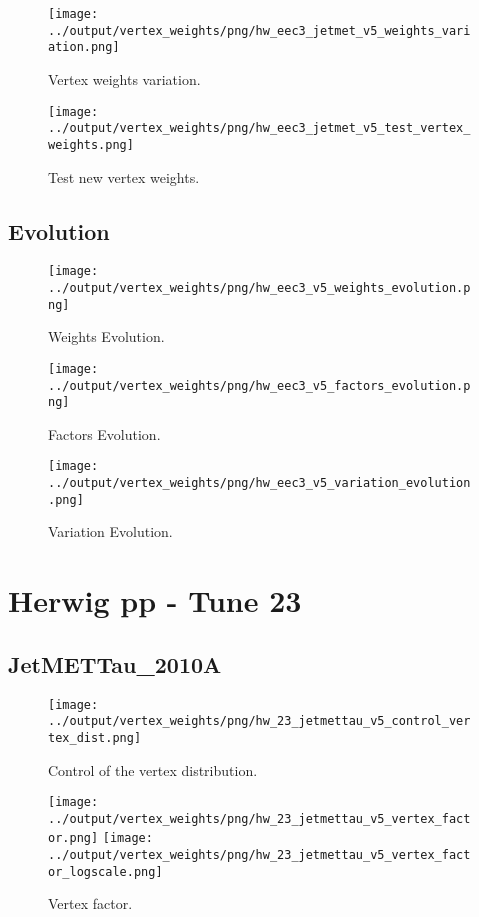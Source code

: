 \documentclass[11pt]{book}
\begin{document}
\begin{figure}[ht]
\centering
\texttt{[image: ../output/vertex\_weights/png/hw\_eec3\_jetmet\_v5\_weights\_variation.png]}
\caption{Vertex weights variation.}
\end{figure}

\begin{figure}[ht]
\centering
\texttt{[image: ../output/vertex\_weights/png/hw\_eec3\_jetmet\_v5\_test\_vertex\_weights.png]}
\caption{Test new vertex weights.}
\end{figure}
\clearpage

\subsection{Evolution}
\begin{figure}[ht]
\centering
\texttt{[image: ../output/vertex\_weights/png/hw\_eec3\_v5\_weights\_evolution.png]}
\caption{Weights Evolution.}
\end{figure}


\begin{figure}[ht]
\centering
\texttt{[image: ../output/vertex\_weights/png/hw\_eec3\_v5\_factors\_evolution.png]}
\caption{Factors Evolution.}
\end{figure}

\begin{figure}[ht]
\centering
\texttt{[image: ../output/vertex\_weights/png/hw\_eec3\_v5\_variation\_evolution.png]}
\caption{Variation Evolution.}
\end{figure}
\clearpage



\section{Herwig pp - Tune 23}
\subsection{JetMETTau\_2010A}
\begin{figure}[ht]
\centering
\texttt{[image: ../output/vertex\_weights/png/hw\_23\_jetmettau\_v5\_control\_vertex\_dist.png]}
\caption{Control of the vertex distribution.}
\end{figure}

\begin{figure}[ht]
\centering
\texttt{[image: ../output/vertex\_weights/png/hw\_23\_jetmettau\_v5\_vertex\_factor.png]}
\texttt{[image: ../output/vertex\_weights/png/hw\_23\_jetmettau\_v5\_vertex\_factor\_logscale.png]}
\caption{Vertex factor.}
\end{figure}
\end{document}
